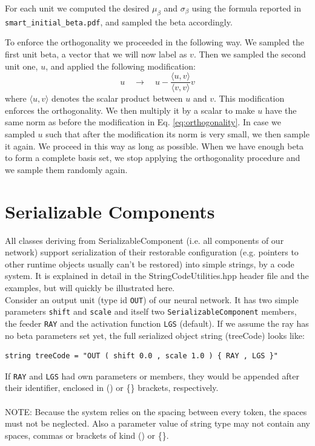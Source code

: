 \documentclass[11pt,a4paper,twoside]{article}
\begin{document}
For each unit we computed the desired $\mu_{\beta}$ and $\sigma_{\beta}$ using the formula reported in \verb+smart_initial_beta.pdf+, and sampled the beta accordingly.

To enforce the orthogonality we proceeded in the following way.
We sampled the first unit beta, a vector that we will now label as $v$. Then we sampled the second unit one, $u$, and applied the following modification:
\begin{equation}
   u \quad \rightarrow \quad u - \frac{\langle u, v \rangle}{\langle v, v \rangle} v     \label{eq:orthogonality}
\end{equation}
where $\langle u, v \rangle$ denotes the scalar product between $u$ and $v$.
This modification enforces the orthogonality.
We then multiply it by a scalar to make $u$ have the same norm as before the modification in Eq. \ref{eq:orthogonality}.
In case we sampled $u$ such that after the modification its norm is very small, we then sample it again.
We proceed in this way as long as possible. When we have enough beta to form a complete basis set, we stop applying the orthogonality procedure and we sample them randomly again.



\section{Serializable Components} %
\label{sec:serializablecomponents}
All classes deriving from SerializableComponent (i.e. all components of our
network) support serialization of their restorable configuration (e.g. pointers
to other runtime objects usually can't be restored) into simple strings, by a
code system. It is explained in detail in
the StringCodeUtilities.hpp header file and the examples, but will quickly be
illustrated here.
\\Consider an output unit (type id \verb+OUT+) of our neural network. It has two simple parameters
\verb+shift+ and \verb+scale+ and itself two \verb+SerializableComponent+ members, the
feeder \verb+RAY+ and the activation function \verb+LGS+ (default). If we
assume the ray has no beta parameters set yet, the full serialized object string (treeCode)
looks like:
\begin{verbatim}
string treeCode = "OUT ( shift 0.0 , scale 1.0 ) { RAY , LGS }"
\end{verbatim}
If \verb+RAY+ and \verb+LGS+ had own parameters or members, they would be appended after their
identifier, enclosed in () or \{\} brackets, respectively.
\\\\NOTE: Because the system relies on the spacing between every token, the
spaces must not be neglected. Also a parameter value of string type may not
contain any spaces, commas or brackets of kind () or \{\}.



\printindex
\end{document}
